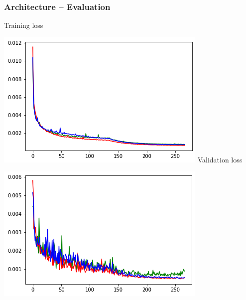 \clearpage

\begin{frame}
    \frametitle{Architecture -- Evaluation}
\begin{multicols}{2}
	Training loss
	
	\includegraphics[width=\columnwidth, height=.7\textheight]{./Ressourcen/Praesentation/Bilder/train_loss.png}%
    \vfill\columnbreak
    Validation loss
    
    \includegraphics[width=\columnwidth, height=.7\textheight]{./Ressourcen/Praesentation/Bilder/val_loss.png}%
\end{multicols}
    
\end{frame}
\clearpage